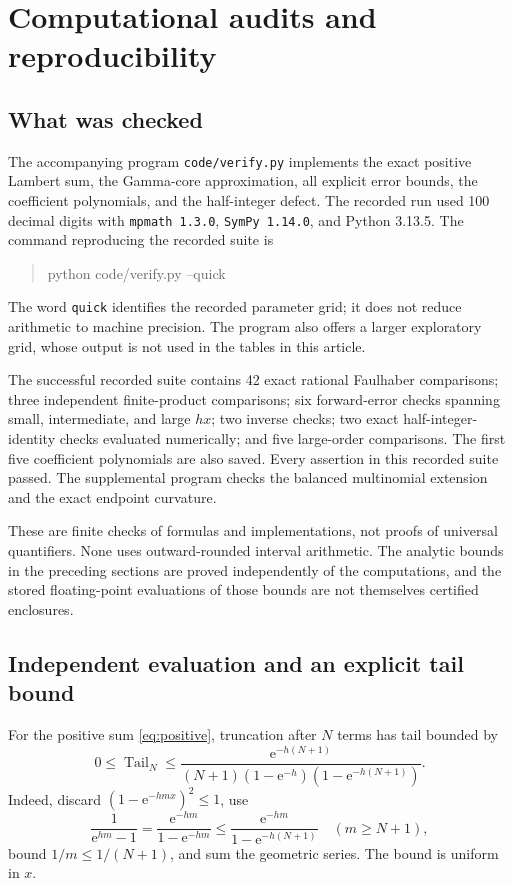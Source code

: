 \documentclass[11pt,a4paper]{article}
\numberwithin{equation}{section}
\theoremstyle{definition}
\newcommand{\ee}{\mathrm e}
\begin{document}
\section{Computational audits and reproducibility}
\label{sec:computations}

\subsection{What was checked}
The accompanying program \texttt{code/verify.py} implements the exact positive Lambert sum, the Gamma-core approximation, all explicit error bounds, the coefficient polynomials, and the half-integer defect. The recorded run used 100 decimal digits with \texttt{mpmath 1.3.0}, \texttt{SymPy 1.14.0}, and Python 3.13.5. The command reproducing the recorded suite is
\begin{quote}\ttfamily
python code/verify.py --quick
\end{quote}
The word \texttt{quick} identifies the recorded parameter grid; it does not reduce arithmetic to machine precision. The program also offers a larger exploratory grid, whose output is not used in the tables in this article.

The successful recorded suite contains 42 exact rational Faulhaber comparisons; three independent finite-product comparisons; six forward-error checks spanning small, intermediate, and large $hx$; two inverse checks; two exact half-integer-identity checks evaluated numerically; and five large-order comparisons. The first five coefficient polynomials are also saved. Every assertion in this recorded suite passed. The supplemental program checks the balanced multinomial extension and the exact endpoint curvature.

These are finite checks of formulas and implementations, not proofs of universal quantifiers. None uses outward-rounded interval arithmetic. The analytic bounds in the preceding sections are proved independently of the computations, and the stored floating-point evaluations of those bounds are not themselves certified enclosures.

\subsection{Independent evaluation and an explicit tail bound}
For the positive sum \eqref{eq:positive}, truncation after $N$ terms has tail bounded by
\begin{equation}
0\le\operatorname{Tail}_N\le
\frac{\ee^{-h(N+1)}}{(N+1)(1-\ee^{-h})(1-\ee^{-h(N+1)})}.
\label{eq:numerictail}
\end{equation}
Indeed, discard $(1-\ee^{-hmx})^2\le1$, use
\[
\frac1{\ee^{hm}-1}=\frac{\ee^{-hm}}{1-\ee^{-hm}}
 \le\frac{\ee^{-hm}}{1-\ee^{-h(N+1)}}\quad(m\ge N+1),
\]
bound $1/m\le1/(N+1)$, and sum the geometric series. The bound is uniform in $x$.
\end{document}
